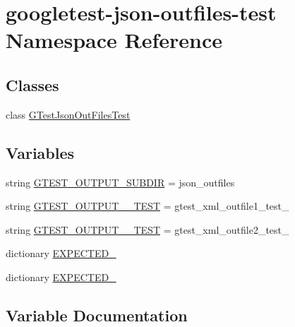 \hypertarget{namespacegoogletest-json-outfiles-test}{}\section{googletest-\/json-\/outfiles-\/test Namespace Reference}
\label{namespacegoogletest-json-outfiles-test}
\subsection*{Classes}
\begin{DoxyCompactItemize}
\item 
class \mbox{\hyperlink{classgoogletest-json-outfiles-test_1_1GTestJsonOutFilesTest}{G\+Test\+Json\+Out\+Files\+Test}}
\end{DoxyCompactItemize}
\subsection*{Variables}
\begin{DoxyCompactItemize}
\item 
string \mbox{\hyperlink{namespacegoogletest-json-outfiles-test_a0f92f4080118c9ed4fce7412abfabf57}{G\+T\+E\+S\+T\+\_\+\+O\+U\+T\+P\+U\+T\+\_\+\+S\+U\+B\+D\+IR}} = \textquotesingle{}json\+\_\+outfiles\textquotesingle{}
\item 
string \mbox{\hyperlink{namespacegoogletest-json-outfiles-test_ace9d5d61931b94cde9f088c67c08089d}{G\+T\+E\+S\+T\+\_\+\+O\+U\+T\+P\+U\+T\+\_\+\_\+\+T\+E\+ST}} = \textquotesingle{}gtest\+\_\+xml\+\_\+outfile1\+\_\+test\+\_\+\textquotesingle{}
\item 
string \mbox{\hyperlink{namespacegoogletest-json-outfiles-test_af99178050ea2a9feaf2d569fcb5c3dae}{G\+T\+E\+S\+T\+\_\+\+O\+U\+T\+P\+U\+T\+\_\+\_\+\+T\+E\+ST}} = \textquotesingle{}gtest\+\_\+xml\+\_\+outfile2\+\_\+test\+\_\+\textquotesingle{}
\item 
dictionary \mbox{\hyperlink{namespacegoogletest-json-outfiles-test_abf0c05f9a69a87f8625d3dd90cc16ed8}{E\+X\+P\+E\+C\+T\+E\+D\+\_}}
\item 
dictionary \mbox{\hyperlink{namespacegoogletest-json-outfiles-test_a4340a105b9ff2d4a132e85a8b6af7d61}{E\+X\+P\+E\+C\+T\+E\+D\+\_}}
\end{DoxyCompactItemize}


\subsection{Variable Documentation}
\mbox{\label{namespacegoogletest-json-outfiles-test_abf0c05f9a69a87f8625d3dd90cc16ed8}} 
